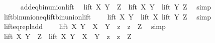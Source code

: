 \begin{isabellebody}
\ \ \ \ \isamarkupfalse%
\ add{\isacharunderscore}{\kern0pt}eq{\isacharunderscore}{\kern0pt}bin{\isacharunderscore}{\kern0pt}union{\isacharunderscore}{\kern0pt}lift\ \isamarkupfalse%
\ {\isachardoublequoteopen}lift\ X\ {\isacharparenleft}{\kern0pt}Y\ {\isacharplus}{\kern0pt}\ Z{\isacharparenright}{\kern0pt}\ {\isacharequal}{\kern0pt}\ lift\ X\ {\isacharparenleft}{\kern0pt}Y\ {\isasymunion}\ lift\ Y\ Z{\isacharparenright}{\kern0pt}{\isachardoublequoteclose}\ \isamarkupfalse%
\ simp\isanewline
\ \ \ \ \isamarkupfalse%
\ \isamarkupfalse%
\ lift{\isacharunderscore}{\kern0pt}bin{\isacharunderscore}{\kern0pt}union{\isacharunderscore}{\kern0pt}eq{\isacharunderscore}{\kern0pt}lift{\isacharunderscore}{\kern0pt}bin{\isacharunderscore}{\kern0pt}union{\isacharunderscore}{\kern0pt}lift\ \isamarkupfalse%
\ {\isachardoublequoteopen}{\isachardot}{\kern0pt}{\isachardot}{\kern0pt}{\isachardot}{\kern0pt}\ {\isacharequal}{\kern0pt}\ {\isacharparenleft}{\kern0pt}lift\ X\ Y{\isacharparenright}{\kern0pt}\ {\isasymunion}\ lift\ X\ {\isacharparenleft}{\kern0pt}lift\ Y\ Z{\isacharparenright}{\kern0pt}{\isachardoublequoteclose}\ \isamarkupfalse%
\ simp\isanewline
\ \ \ \ \isamarkupfalse%
\ \isamarkupfalse%
\ lift{\isacharunderscore}{\kern0pt}eq{\isacharunderscore}{\kern0pt}repl{\isacharunderscore}{\kern0pt}add\ \isamarkupfalse%
\ {\isachardoublequoteopen}{\isachardot}{\kern0pt}{\isachardot}{\kern0pt}{\isachardot}{\kern0pt}\ {\isacharequal}{\kern0pt}\ {\isacharparenleft}{\kern0pt}lift\ X\ Y{\isacharparenright}{\kern0pt}\ {\isasymunion}\ {\isacharbraceleft}{\kern0pt}X\ {\isacharplus}{\kern0pt}\ {\isacharparenleft}{\kern0pt}Y\ {\isacharplus}{\kern0pt}\ z{\isacharparenright}{\kern0pt}\ {\isacharbar}{\kern0pt}\ z\ {\isasymin}\ Z{\isacharbraceright}{\kern0pt}{\isachardoublequoteclose}\ \isamarkupfalse%
\ simp\isanewline
\ \ \ \ \isamarkupfalse%
\ \isamarkupfalse%
\ {\isachardoublequoteopen}lift\ X\ {\isacharparenleft}{\kern0pt}Y\ {\isacharplus}{\kern0pt}\ Z{\isacharparenright}{\kern0pt}\ {\isacharequal}{\kern0pt}\ {\isacharparenleft}{\kern0pt}lift\ X\ Y{\isacharparenright}{\kern0pt}\ {\isasymunion}\ {\isacharbraceleft}{\kern0pt}X\ {\isacharplus}{\kern0pt}\ {\isacharparenleft}{\kern0pt}Y\ {\isacharplus}{\kern0pt}\ z{\isacharparenright}{\kern0pt}\ {\isacharbar}{\kern0pt}\ z\ {\isasymin}\ Z{\isacharbraceright}{\kern0pt}{\isachardoublequoteclose}\ \isacommand{{\isachardot}{\kern0pt}}\isamarkupfalse%

\end{isabellebody}
